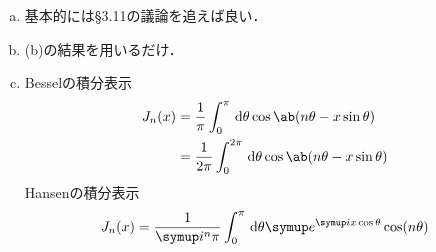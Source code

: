 \begin{enumerate}[%
  label=%
  \fbox{%
   {\thesection.\arabic*}%
    },%
    ]
\begin{enumerate}[(a)]
        さて，デルタ関数は，$\sinc$関数を用いて
        \begin{gather}
          \lim_{\epsilon \to 0} \delta_\epsilon(x) %
          = \lim_{\epsilon \to 0} \frac{\sin(x/\epsilon)}{x / \epsilon} %
          \frac{1}{\pi \epsilon} = \delta(x)\\
          \lim_{\epsilon \to 0} \frac{\cos(x/\epsilon)}{x/\epsilon} %
          \frac{1}{\pi \epsilon} = 0
        \end{gather}
        として表すことができることに注意すると，
        \begin{gather}
          \lim_{R\to \infty} \frac{1}{\pi}%
          \frac{1}{\sqrt{kk'}}\ab[\frac{\sin\ab[(k-k')R]}{k-k'}]  %
          = \frac{1}{k}\delta(k-k')\\
          \begin{split}
            &\lim_{R \to \infty} \frac{1}{\pi} %
            \frac{1}{\sqrt{kk'}} \frac{\cos\ab[(k+k')R - \nu \pi]}{k+k'} \\
            &\qq\qq\qq  = \frac{1}{\sqrt{kk'}} \delta(k+k')\cos(\nu \pi) %
            = 0 \qq \text{if}\qq k, k'>0
        \end{split}
        \end{gather}
        であるから，
        \begin{gather}
          \int_0^\infty \dl{\rho}\rho J_\nu(k\rho) J_\nu(k' \rho) = \frac{1}{k}\delta(k-k')
        \end{gather}
        が従う．
      \item 基本的には§3.11の議論を追えば良い．
      \item (b)の結果を用いるだけ．
      \item Besselの積分表示
        \begin{align}
          J_n(x) &= \frac{1}{\pi} \int_0^\pi \dl{\theta}\cos\ab(n\theta - x \sin\theta)\\
                 &=  \frac{1}{2\pi} %
                 \int_0^{2\pi} \dl{\theta} \cos\ab(n \theta - x \sin\theta)
        \end{align}
        Hansenの積分表示
        \begin{gather}
          J_n(x) = \frac{1}{\i^n \pi} \int_0^\pi \dl{\theta} %
          \e^{\i x \cos\theta} \cos (n\theta)
        \end{gather}
    \end{enumerate}


\end{enumerate}
